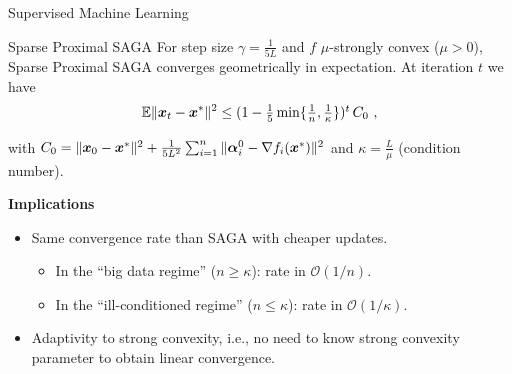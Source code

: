 \documentclass[10pt]{beamer}
\begin{document}
\begin{frame}{Supervised Machine Learning}


\end{frame}

\begin{frame}{Sparse Proximal SAGA}
For step size $\gamma = \frac{1}{5L}$ and $f$ $\mu$-strongly convex ($\mu > 0$), Sparse Proximal SAGA converges geometrically in expectation. At iteration $t$ we have
\vspace{0.5em}$$
\mathbb{E} \|{\boldsymbol x}_t - {\boldsymbol x}^*\|^2 \leq (1-\textstyle\frac{1}{5} \min\{\frac{1}{n}, \frac{1}{\kappa}\})^t\, C_0~,
$$

\vspace{1em}with $C_0 = \|{\boldsymbol x}_0 - {\boldsymbol x}^*\|^2 + \textstyle\frac{1}{5 L^2} \textstyle\sum_{i=1}^n\|{\boldsymbol\alpha}_i^0 - \nabla f_i({\boldsymbol x}^*)\|^2$ and $
\kappa = \frac{L}{\mu}$ (condition number).

\vspace{1.5em} {\bfseries Implications}
\begin{itemize}\setlength\itemsep{0.5em}
\vspace{0.5em}\item Same convergence rate than SAGA with cheaper updates.
\begin{itemize}
\vspace{0.3em}\item {\normalsize In the ``big data regime'' ($n \geq \kappa$):  rate in $\mathcal{O}(1/n)$}.
\vspace{0.3em}\item {\normalsize In the ``ill-conditioned regime'' ($n \leq \kappa$):  rate in $\mathcal{O}(1/\kappa)$}.
\end{itemize}
\item Adaptivity to strong convexity, i.e., no need to know strong convexity parameter to obtain linear convergence.
\end{itemize}
\vspace{1.3em}
\end{frame}
\end{document}
